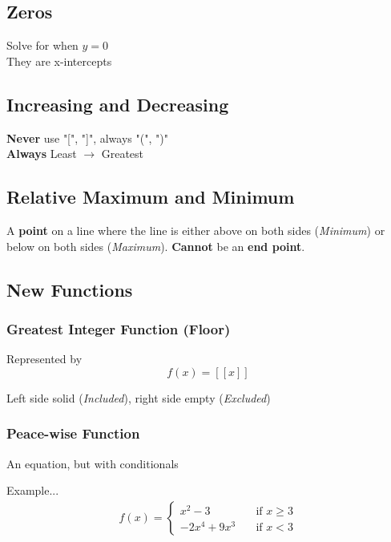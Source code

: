 \documentclass[twocolumn]{article}
\newcommand{\bd}{\textbf}
\begin{document}
	\subsection{Zeros}
	Solve for when $y = 0$ \\
	They are x-intercepts
	
	\subsection{Increasing and Decreasing}
	\par \bd{Never} use "[", "]", always "(", ")" \\
	\bd{Always} Least $\to$ Greatest \\
	
	
	\subsection{Relative Maximum and Minimum}
	A \bd{point} on a line where the line is either above on both sides (\emph{Minimum}) or below on both sides (\emph{Maximum}). \bd{Cannot} be an \bd{end point}.
	
	
	\subsection{New Functions}
	
	\subsubsection{Greatest Integer Function (Floor)}
	Represented by
	\begin{equation*}
		f(x) = [[x]]
	\end{equation*}
	
	Left side solid (\emph{Included}), right side empty (\emph{Excluded})
	
	\subsubsection{Peace-wise Function}
	\par An equation, but with conditionals
	
	Example...
	\begin{align*}
		f(x) = 
		\begin{cases}
			x^2 - 3      &\quad \text{if } x \ge 3 \\
			-2x^4 + 9x^3 &\quad \text{if } x < 3
		\end{cases}
	\end{align*}
	
\end{document}
